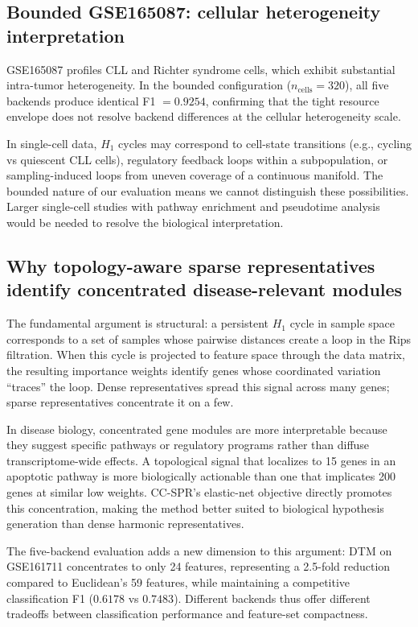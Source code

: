 \documentclass[11pt]{article}
\begin{document}
\subsection{Bounded GSE165087: cellular heterogeneity interpretation}

GSE165087 profiles CLL and Richter syndrome cells, which exhibit substantial intra-tumor heterogeneity.
In the bounded configuration ($n_{\text{cells}} = 320$), all five backends produce identical F1 $= 0.9254$, confirming that the tight resource envelope does not resolve backend differences at the cellular heterogeneity scale.

In single-cell data, $H_1$ cycles may correspond to cell-state transitions (e.g., cycling vs quiescent CLL cells), regulatory feedback loops within a subpopulation, or sampling-induced loops from uneven coverage of a continuous manifold.
The bounded nature of our evaluation means we cannot distinguish these possibilities.
Larger single-cell studies with pathway enrichment and pseudotime analysis would be needed to resolve the biological interpretation.

\subsection{Why topology-aware sparse representatives identify concentrated disease-relevant modules}

The fundamental argument is structural: a persistent $H_1$ cycle in sample space corresponds to a set of samples whose pairwise distances create a loop in the Rips filtration.
When this cycle is projected to feature space through the data matrix, the resulting importance weights identify genes whose coordinated variation ``traces'' the loop.
Dense representatives spread this signal across many genes; sparse representatives concentrate it on a few.

In disease biology, concentrated gene modules are more interpretable because they suggest specific pathways or regulatory programs rather than diffuse transcriptome-wide effects.
A topological signal that localizes to 15 genes in an apoptotic pathway is more biologically actionable than one that implicates 200 genes at similar low weights.
CC-SPR's elastic-net objective directly promotes this concentration, making the method better suited to biological hypothesis generation than dense harmonic representatives.

The five-backend evaluation adds a new dimension to this argument: DTM on GSE161711 concentrates to only 24 features, representing a 2.5-fold reduction compared to Euclidean's 59 features, while maintaining a competitive classification F1 ($0.6178$ vs $0.7483$).
Different backends thus offer different tradeoffs between classification performance and feature-set compactness.
\end{document}
